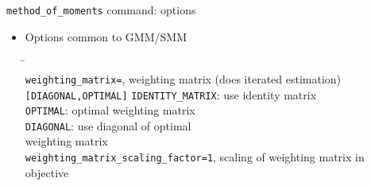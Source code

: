 \begin{frame}{\texttt{method\_of\_moments} command: options}

  \begin{itemize}
    \item Options common to GMM/SMM
          \begin{tabbing}
            \=\hspace*{7cm}\= \\
            \>\texttt{weighting\_matrix=}, \> weighting matrix (does iterated estimation)\\
            \>\texttt{[\textquotesingle DIAGONAL\textquotesingle ,\textquotesingle OPTIMAL\textquotesingle]} \>\texttt{IDENTITY\_MATRIX}: use identity matrix\\
            \> \> \texttt{OPTIMAL}: optimal weighting matrix\\
            \> \> \texttt{DIAGONAL}: use diagonal of optimal\\
             \> \> weighting matrix\\
            \>\texttt{weighting\_matrix\_scaling\_factor=1},  \>scaling of weighting matrix in objective\\
          \end{tabbing}
  \end{itemize}
\end{frame}


